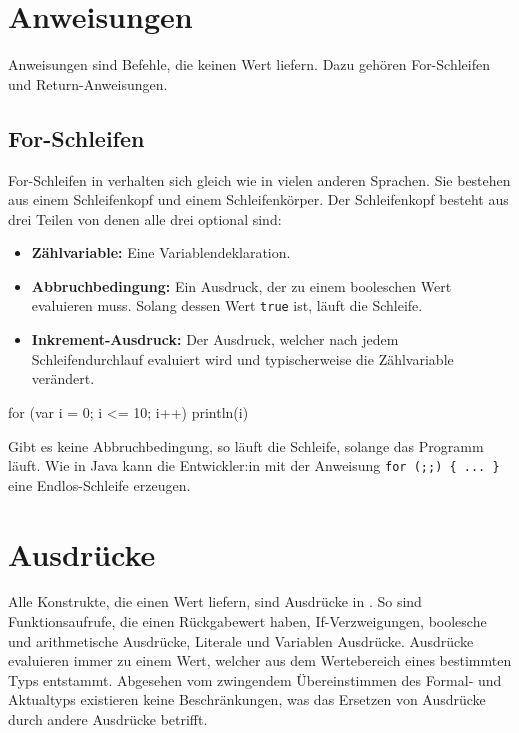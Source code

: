 \section{Anweisungen}

Anweisungen sind Befehle, die keinen Wert liefern. Dazu gehören For-Schleifen und Return-Anweisungen.

\subsection{For-Schleifen}

For-Schleifen in \toya verhalten sich gleich wie in vielen anderen Sprachen. Sie bestehen aus einem Schleifenkopf und einem Schleifenkörper. Der Schleifenkopf besteht aus drei Teilen von denen alle drei optional sind:
\begin{itemize}
    \item \textbf{Zählvariable:} Eine Variablendeklaration.
    \item \textbf{Abbruchbedingung:} Ein Ausdruck, der zu einem booleschen Wert evaluieren muss. Solang dessen Wert \texttt{true} ist, läuft die Schleife.  
    \item \textbf{Inkrement-Ausdruck:} Der Ausdruck, welcher nach jedem Schleifendurchlauf evaluiert wird und typischerweise die Zählvariable verändert.
\end{itemize}

\begin{ToyaCode}[numbers=none, caption={Eine For-Schleife, die die Zählvariable auf die Konsole ausgibt.}]
for (var i = 0; i <= 10; i++) {
    println(i)
}
\end{ToyaCode}

Gibt es keine Abbruchbedingung, so läuft die Schleife, solange das Programm läuft. Wie in Java kann die Entwickler:in mit der Anweisung \texttt{for (;;) \{ ... \}} eine Endlos-Schleife erzeugen.

\section{Ausdrücke}

Alle Konstrukte, die einen Wert liefern, sind Ausdrücke in \toya. So sind Funktionsaufrufe, die einen Rückgabewert haben, If-Verzweigungen, boolesche und arithmetische Ausdrücke, Literale und Variablen Ausdrücke. Ausdrücke evaluieren immer zu einem Wert, welcher aus dem Wertebereich eines bestimmten Typs entstammt. Abgesehen vom zwingendem Übereinstimmen des Formal- und Aktualtyps existieren keine Beschränkungen, was das Ersetzen von Ausdrücke durch andere Ausdrücke betrifft.

